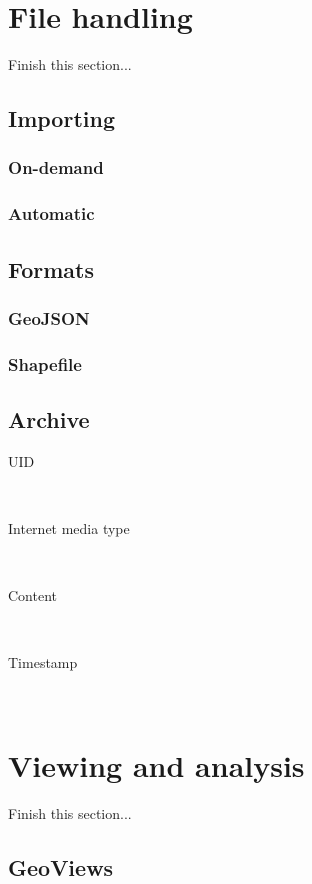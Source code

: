 \section{File handling}
Finish this section...

\subsection{Importing}
\subsubsection{On-demand}
\subsubsection{Automatic}

\subsection{Formats}
\subsubsection{GeoJSON}
\subsubsection{Shapefile}


\subsection{Archive}
\begin{description}
\item[UID] \hfill \\
\item[Internet media type] \hfill \\
\item[Content] \hfill \\
\item[Timestamp] \hfill \\
\end{description}


\section{Viewing and analysis}
Finish this section...
\subsection{GeoViews}

